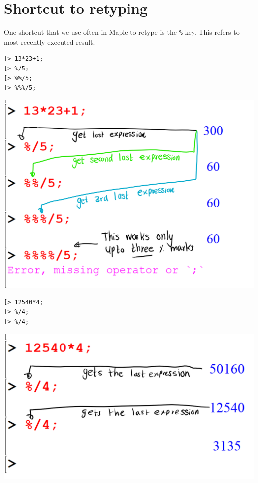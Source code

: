 \documentclass[
]{book}
\theoremstyle{definition}
\theoremstyle{definition}
\theoremstyle{definition}
\theoremstyle{definition}
\theoremstyle{remark}
\begin{document}
\section{Shortcut to retyping}\label{shortcut-to-retyping}

One shortcut that we use often in Maple to retype is the \texttt{\%} key. This refers to most recently executed result.

\begin{verbatim}
[> 13*23+1;
[> %/5;
[> %%/5;
[> %%%/5;
\end{verbatim}

\includegraphics{figures/Lesson 1/fig17.png}

\begin{verbatim}
[> 12540*4;
[> %/4;
[> %/4;
\end{verbatim}

\includegraphics{figures/Lesson 1/fig18.png}
\end{document}
